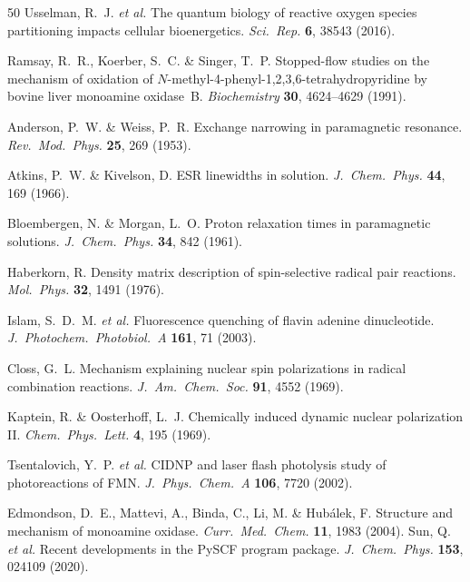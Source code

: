 \documentclass[11pt]{article}
\begin{document}
\begin{thebibliography}{50}
\label{ref:Usselman2016} Usselman, R.~J. \textit{et al.} The quantum biology of reactive oxygen species partitioning impacts cellular bioenergetics. \textit{Sci.\ Rep.} \textbf{6}, 38543 (2016).

\label{ref:Ramsay1991} Ramsay, R.~R., Koerber, S.~C. \& Singer, T.~P. Stopped-flow studies on the mechanism of oxidation of $N$-methyl-4-phenyl-1,2,3,6-tetrahydropyridine by bovine liver monoamine oxidase~B. \textit{Biochemistry} \textbf{30}, 4624--4629 (1991).



 Anderson, P.~W. \& Weiss, P.~R. Exchange narrowing in paramagnetic resonance. \textit{Rev.\ Mod.\ Phys.} \textbf{25}, 269 (1953).

 Atkins, P.~W. \& Kivelson, D. ESR linewidths in solution. \textit{J.\ Chem.\ Phys.} \textbf{44}, 169 (1966).

 Bloembergen, N. \& Morgan, L.~O. Proton relaxation times in paramagnetic solutions. \textit{J.\ Chem.\ Phys.} \textbf{34}, 842 (1961).

 Haberkorn, R. Density matrix description of spin-selective radical pair reactions. \textit{Mol.\ Phys.} \textbf{32}, 1491 (1976).

 Islam, S.~D.~M. \textit{et al.} Fluorescence quenching of flavin adenine dinucleotide. \textit{J.\ Photochem.\ Photobiol.\ A} \textbf{161}, 71 (2003).

 Closs, G.~L. Mechanism explaining nuclear spin polarizations in radical combination reactions. \textit{J.\ Am.\ Chem.\ Soc.} \textbf{91}, 4552 (1969).

 Kaptein, R. \& Oosterhoff, L.~J. Chemically induced dynamic nuclear polarization II. \textit{Chem.\ Phys.\ Lett.} \textbf{4}, 195 (1969).

 Tsentalovich, Y.~P. \textit{et al.} CIDNP and laser flash photolysis study of photoreactions of FMN. \textit{J.\ Phys.\ Chem.\ A} \textbf{106}, 7720 (2002).

 Edmondson, D.~E., Mattevi, A., Binda, C., Li, M. \& Hub\'{a}lek, F. Structure and mechanism of monoamine oxidase. \textit{Curr.\ Med.\ Chem.} \textbf{11}, 1983 (2004).
 Sun, Q. \textit{et al.} Recent developments in the PySCF program package. \textit{J.\ Chem.\ Phys.} \textbf{153}, 024109 (2020).


\end{thebibliography}
\end{document}
